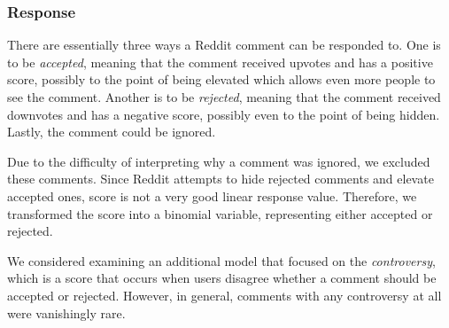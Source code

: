 \subsubsection{Response}
There are essentially three ways a Reddit comment can be responded to. One is to be \textit{accepted}, meaning that the comment received upvotes and has a positive score, possibly to the point of being elevated which allows even more people to see the comment. Another is to be \textit{rejected}, meaning that the comment received downvotes and has a negative score, possibly even to the point of being hidden. Lastly, the comment could be ignored. 

Due to the difficulty of interpreting why a comment was ignored, we excluded these comments. Since Reddit attempts to hide rejected comments and elevate accepted ones, score is not a very good linear response value. Therefore, we transformed the score into a binomial variable, representing either accepted or rejected.

We considered examining an additional model that focused on the \textit{controversy}, which is a score that occurs when users disagree whether a comment should be accepted or rejected. However, in general, comments with any controversy at all were vanishingly rare.

